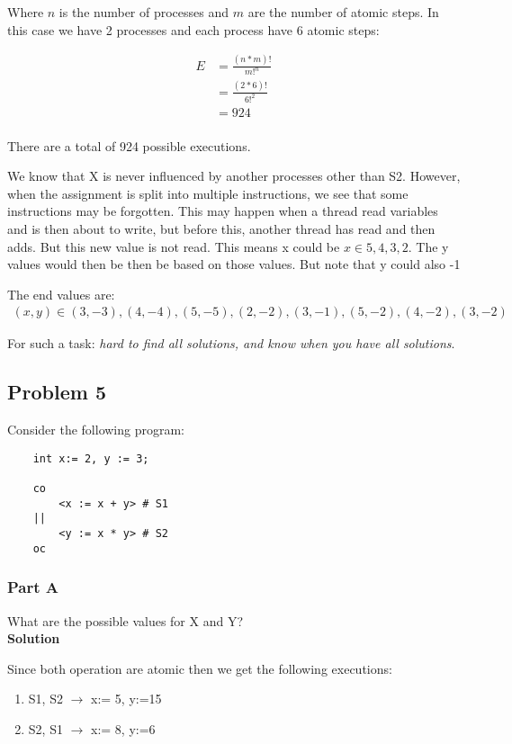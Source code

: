 Where $n$ is the number of processes and $m$ are the number of atomic steps. In this case we have 2 processes and each process have 6 atomic steps: 

\begin{align*}
    E &= \frac{(n*m)!}{m!^{n}} \\
      &= \frac{(2*6)!}{6!^{2}} \\
      &= 924 \\
\end{align*}

There are a total of 924 possible executions. 

We know that X is never influenced by another processes other than S2. 
However, when the assignment is split into multiple instructions, we see that some instructions may be forgotten.
This may happen when a thread read variables and is then about to write, but before this, another thread has read and then adds. But this new value is not read. 
This means x could be $x \in {5,4,3,2}$. The y values would then be then be based on those values. But note that y could also -1

The end values are: 
\begin{align*}
    (x,y) \in (3,-3), (4,-4), (5, -5), (2, -2), (3, -1), (5, -2), (4, -2), (3, -2)
\end{align*}

For such a task: \textit{hard to find all solutions, and know when you have all solutions}. 



\subsection{Problem 5}

Consider the following program:

\begin{lstlisting}
    int x:= 2, y := 3;

    co
        <x := x + y> # S1
    ||
        <y := x * y> # S2
    oc
\end{lstlisting}


\subsubsection{Part A}

What are the possible values for X and Y? \\

\textbf{Solution}

Since both operation are atomic then we get the following executions: 
\begin{enumerate}
    \item S1, S2 $\to$ x:= 5, y:=15
    \item S2, S1 $\to$ x:= 8, y:=6
\end{enumerate}

